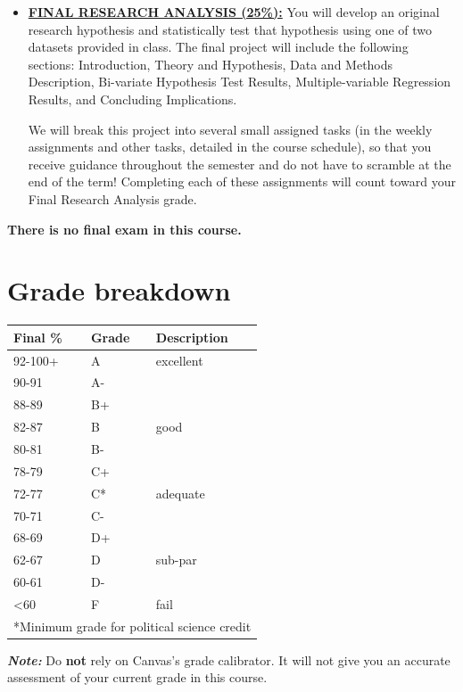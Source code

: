 \documentclass[11pt]{article}
\begin{document}
\begin{itemize}
	\item \underline{\textbf{FINAL RESEARCH ANALYSIS (25\%):}} You will develop an original research hypothesis and statistically test that hypothesis using one of two datasets provided in class. The final project will include the following sections: Introduction, Theory and Hypothesis, Data and Methods Description, Bi-variate Hypothesis Test Results, Multiple-variable Regression Results, and Concluding Implications.

 We will break this project into several small assigned tasks (in the weekly assignments and other tasks, detailed in the course schedule), so that you receive guidance throughout the semester and do not have to scramble at the end of the term! Completing each of these assignments will count toward your Final Research Analysis grade.

\end{itemize}

	\textbf{There is no final exam in this course.}

\section*{Grade breakdown}

\begin{table}[h!]
\hspace{20pt}
    \begin{tabular}{l|l|l}
\textbf{Final \%} & \textbf{Grade} & \textbf{Description}\\\hline
92-100+ & A & excellent\\
90-91	& A-& \\ \hline
88-89	& B+& \\
82-87	& B & good \\
80-81	& B-& \\ \hline
78-79	& C+& \\
72-77	& C* & adequate \\
70-71	& C-& \\ \hline
68-69	& D+& \\
62-67	& D& sub-par\\
60-61	& D- \\ \hline
<60    & F & fail\\
\multicolumn{3}{l}{*Minimum grade for political science credit}\\
    \end{tabular}
\end{table}

\noindent \textbf{\textit{Note: }} Do \textbf{not} rely on Canvas's grade calibrator. It will not give you an accurate assessment of your current grade in this course.
\end{document}
